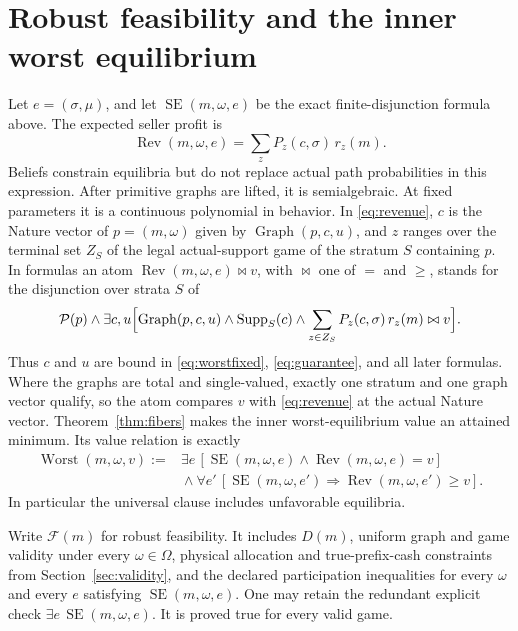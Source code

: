 \documentclass[11pt,a4paper]{article}
\numberwithin{equation}{section}
\theoremstyle{definition}
\DeclareMathOperator{\SE}{SE}
\DeclareMathOperator{\Graph}{Graph}
\DeclareMathOperator{\Rev}{Rev}
\begin{document}
\section{Robust feasibility and the inner worst equilibrium}\label{sec:feasible}
Let \(e=(\sigma,\mu)\), and let \(\SE(m,\omega,e)\) be the exact
finite-disjunction formula above.
The expected seller profit is
\begin{equation}\label{eq:revenue}
 \Rev(m,\omega,e)=\sum_z P_z(c,\sigma)\,r_z(m).
\end{equation}
Beliefs constrain equilibria but do not replace actual path
probabilities in this expression.
After primitive graphs are lifted, it is semialgebraic.
At fixed parameters it is a continuous polynomial in behavior.
In \eqref{eq:revenue}, \(c\) is the Nature vector of \(p=(m,\omega)\)
given by \(\Graph(p,c,u)\), and \(z\) ranges over the terminal set
\(Z_S\) of the legal actual-support game of the stratum \(S\) containing
\(p\). In formulas an atom \(\Rev(m,\omega,e)\bowtie v\), with \(\bowtie\)
one of \(=\) and \(\ge\), stands for the disjunction over strata \(S\) of
\[
 \mathcal P(p)\wedge\exists c,u\Bigl[\Graph(p,c,u)\wedge
   \operatorname{Supp}_S(c)\wedge
   \sum_{z\in Z_S}P_z(c,\sigma)\,r_z(m)\bowtie v\Bigr].
\]
Thus \(c\) and \(u\) are bound in \eqref{eq:worstfixed},
\eqref{eq:guarantee}, and all later formulas. Where the graphs are total
and single-valued, exactly one stratum and one graph vector qualify, so
the atom compares \(v\) with \eqref{eq:revenue} at the actual Nature
vector.
Theorem~\ref{thm:fibers} makes the inner worst-equilibrium value an
attained minimum. Its value relation is exactly
\begin{equation}\label{eq:worstfixed}
 \begin{split}
 \operatorname{Worst}(m,\omega,v):={}&
 \exists e\,[\SE(m,\omega,e)\wedge\Rev(m,\omega,e)=v]\\
 &{}\wedge
 \forall e'\,[\SE(m,\omega,e')\Rightarrow
                           \Rev(m,\omega,e')\ge v].
 \end{split}
\end{equation}
In particular the universal clause includes unfavorable equilibria.

Write \(\mathcal F(m)\) for robust feasibility.
It includes \(D(m)\), uniform graph and game validity under every
\(\omega\in\Omega\), physical allocation and true-prefix-cash
constraints from Section~\ref{sec:validity}, and the declared
participation inequalities for every \(\omega\) and every \(e\)
satisfying \(\SE(m,\omega,e)\).
One may retain the redundant explicit check
\(\exists e\,\SE(m,\omega,e)\).
It is proved true for every valid game.
\end{document}
